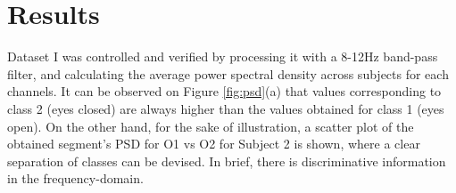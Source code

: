 
%

\section{Results}

Dataset I was controlled and verified by processing it with a 8-12Hz band-pass filter, and calculating the average power spectral density across subjects for each channels.  It can be observed on Figure \ref{fig:psd}(a)  that values corresponding to class 2 (eyes closed) are always higher than the values obtained for class 1 (eyes open). On the other hand, for the sake of illustration, a scatter plot of the obtained segment's PSD for O1 vs O2 for Subject 2 is shown, where a clear separation of classes can be devised.  In brief, there is discriminative information in the frequency-domain.



